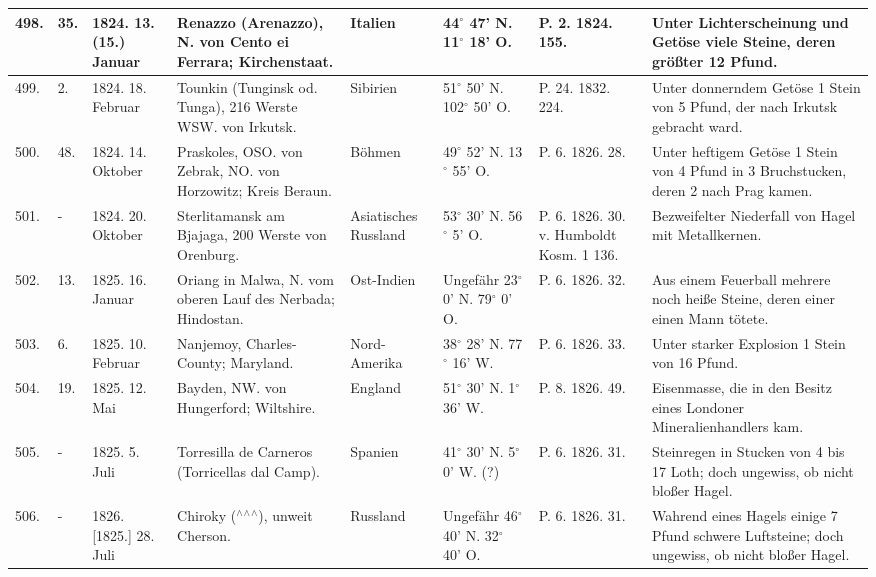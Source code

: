 \documentclass[a4paper, 11pt, oneside, polutonikogreek, german]{article}
\begin{document}
\begin{table}[!ht]
\begin{tabular}{|l|l|l|l|l|l|l|l|}
        498. & 35. & 1824. 13. (15.) Januar & Renazzo (Arenazzo), N. von Cento ei Ferrara; Kirchenstaat. & Italien & 44$^\circ$ 47' N. 11$^\circ$ 18' O. & P. 2. 1824. 155. & Unter Lichterscheinung und Getöse viele Steine, deren größter 12 Pfund. \\ \hline
        499. & 2. & 1824. 18. Februar & Tounkin (Tunginsk od. Tunga), 216 Werste WSW. von Irkutsk. & Sibirien & 51$^\circ$ 50' N. 102$^\circ$ 50' O. & P. 24. 1832. 224. & Unter donnerndem Getöse 1 Stein von 5 Pfund, der nach Irkutsk gebracht ward. \\ \hline
        500. & 48. & 1824. 14. Oktober & Praskoles, OSO. von Zebrak, NO. von Horzowitz; Kreis Beraun. & Böhmen & 49$^\circ$ 52' N. 13$^\circ$ 55' O. & P. 6. 1826. 28. & Unter heftigem Getöse 1 Stein von 4 Pfund in 3 Bruchstucken, deren 2 nach Prag kamen. \\ \hline
        501. & - & 1824. 20. Oktober & Sterlitamansk am Bjajaga, 200 Werste von Orenburg. & Asiatisches Russland & 53$^\circ$ 30' N. 56$^\circ$ 5' O. & P. 6. 1826. 30. v. Humboldt Kosm. 1 136. & Bezweifelter Niederfall von Hagel mit Metallkernen. \\ \hline
        502. & 13. & 1825. 16. Januar & Oriang in Malwa, N. vom oberen Lauf des Nerbada; Hindostan. & Ost-Indien & Ungefähr 23$^\circ$ 0' N. 79$^\circ$ 0' O. & P. 6. 1826. 32. & Aus einem Feuerball mehrere noch heiße Steine, deren einer einen Mann tötete. \\ \hline
        503. & 6. & 1825. 10. Februar & Nanjemoy, Charles-County; Maryland. & Nord-Amerika & 38$^\circ$ 28' N. 77$^\circ$ 16' W. & P. 6. 1826. 33. & Unter starker Explosion 1 Stein von 16 Pfund. \\ \hline
        504. & 19. & 1825. 12. Mai & Bayden, NW. von Hungerford; Wiltshire. & England & 51$^\circ$ 30' N. 1$^\circ$ 36' W. & P. 8. 1826. 49. & Eisenmasse, die in den Besitz eines Londoner Mineralienhandlers kam. \\ \hline
        505. & - & 1825. 5. Juli & Torresilla de Carneros (Torricellas dal Camp). & Spanien & 41$^\circ$ 30' N. 5$^\circ$ 0' W. (?) & P. 6. 1826. 31. & Steinregen in Stucken von 4 bis 17 Loth; doch ungewiss, ob nicht bloßer Hagel. \\ \hline
        506. & - & 1826. [1825.] 28. Juli & Chiroky ($^\wedge$$^\wedge$$^\wedge$), unweit Cherson. & Russland & Ungefähr 46$^\circ$ 40' N. 32$^\circ$ 40' O. & P. 6. 1826. 31. & Wahrend eines Hagels einige 7 Pfund schwere Luftsteine; doch ungewiss, ob nicht bloßer Hagel. \\ \hline

\end{tabular}
\end{table}
\end{document}

